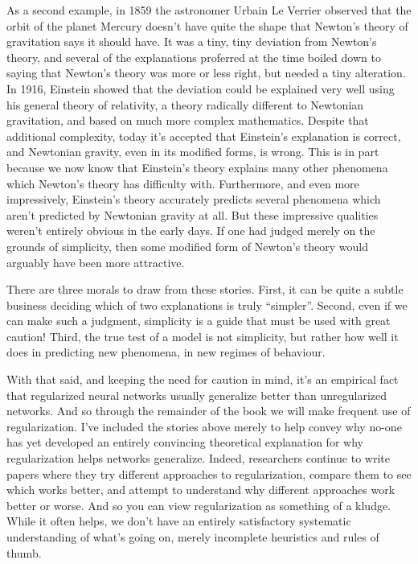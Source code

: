 As a second example, in 1859 the astronomer Urbain Le Verrier observed that the orbit of the planet Mercury doesn't have quite the shape that Newton's theory of gravitation says it should have. It was a tiny, tiny deviation from Newton's theory, and several of the explanations proferred at the time boiled down to saying that Newton's theory was more or less right, but needed a tiny alteration. In 1916, Einstein showed that the deviation could be explained very well using his general theory of relativity, a theory radically different to Newtonian gravitation, and based on much more complex mathematics. Despite that additional complexity, today it's accepted that Einstein's explanation is correct, and Newtonian gravity, even in its modified forms, is wrong. This is in part because we now know that Einstein's theory explains many other phenomena which Newton's theory has difficulty with. Furthermore, and even more impressively, Einstein's theory accurately predicts several phenomena which aren't predicted by Newtonian gravity at all. But these impressive qualities weren't entirely obvious in the early days. If one had judged merely on the grounds of simplicity, then some modified form of Newton's theory would arguably have been more attractive.


There are three morals to draw from these stories. First, it can be quite a subtle business deciding which of two explanations is truly ``simpler''. Second, even if we can make such a judgment, simplicity is a guide that must be used with great caution! Third, the true test of a model is not simplicity, but rather how well it does in predicting new phenomena, in new regimes of behaviour.


With that said, and keeping the need for caution in mind, it's an empirical fact that regularized neural networks usually generalize better than unregularized networks. And so through the remainder of the book we will make frequent use of regularization. I've included the stories above merely to help convey why no-one has yet developed an entirely convincing theoretical explanation for why regularization helps networks generalize. Indeed, researchers continue to write papers where they try different approaches to regularization, compare them to see which works better, and attempt to understand why different approaches work better or worse. And so you can view regularization as something of a kludge. While it often helps, we don't have an entirely satisfactory systematic understanding of what's going on, merely incomplete heuristics and rules of thumb.


